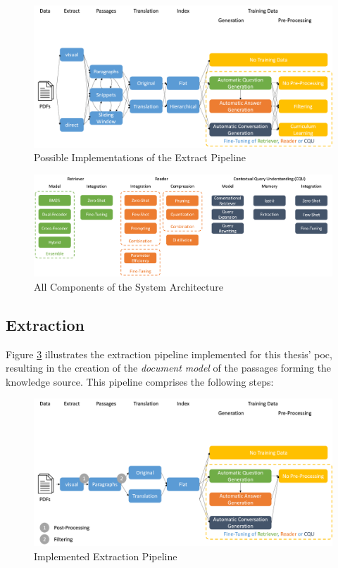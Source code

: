\begin{figure}
    \centering
    \includegraphics[width=\textwidth]{Grafiken/extract_pipeline.png}
    \caption{Possible Implementations of the Extract Pipeline}
    \label{fig:extract-pipeline-implementation-grid}
\end{figure}

\begin{figure}
    \centering
    \includegraphics[width=\textwidth]{Grafiken/all_components_conrag.png}
    \caption{All Components of the System Architecture}
    \label{fig:all-components-conrag-grid}
\end{figure}

\subsection{Extraction}
\label{subsec:index}

Figure \ref{fig:extract-pipeline-implementation} illustrates the extraction pipeline implemented for this thesis' \gls{poc}, resulting in the creation of the \textit{document model} of the passages forming the knowledge source. This pipeline comprises the following steps:

\begin{figure}
    \centering
    \includegraphics[width=\textwidth]{Grafiken/Evaluation/extract_implemented.png}
    \caption{Implemented Extraction Pipeline}
    \label{fig:extract-pipeline-implementation}
\end{figure}

